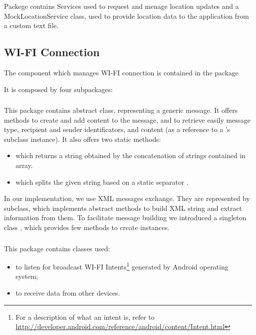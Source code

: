 Packege  contains Services used to request and menage location updates and a MockLocationService class, used to provide location data to the application from a custom text file.

\subsection{WI-FI Connection}
The component which manages WI-FI connection is contained in the package 
\begin{center}
\end{center} 
It is composed by four subpackages:
	\\
	\subsubsection{}
	This package contains  abstract class, representing a generic message. It offers methods to create and add content to the message, and to retrieve easily message type, recipient and sender identificators, and content (as a reference to a 's subclass instance). It also offers two static methods:
	\begin{itemize}
		\item {} which returns a string obtained by the concatenation of strings contained in  array.
		\item {} which splits the given string based on a static separator . 
	\end{itemize}
	In our implementation, we use XML messages exchange. They are represented by  subclass, which implements  abstract methods to build XML string and extract information from them. To facilitate message building we introduced a singleton class , which provides few methods to create  instances.
	\hfill\\
	\subsubsection{}
	This package contains classes used:
	\begin{itemize}
		\item to listen for broadcast WI-FI Intents\footnote{For a description of what an intent is, refer to \url{http://developer.android.com/reference/android/content/Intent.html}} generated by Android operating system;
		\item to receive data from other devices.
	\end{itemize}
	
